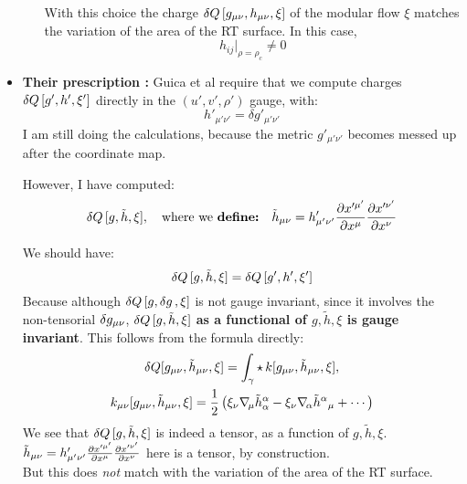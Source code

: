 \documentclass[12pt,a4paper,utf8]{article}
\begin{document}
\begin{itemize}
\begin{itemize}
		With this choice the charge $\mathinner{\delta Q}[g_{\mu\nu},h_{\mu\nu},\xi]$ of the modular flow $\xi$ matches the variation of the area of the RT surface. In this case,
		\begin{equation}
			h_{ij}|_{\rho = \rho_c} \ne 0
		\end{equation}
	
	\end{itemize}
	
\item \textbf{Their prescription \cite{Guica:2019nzm,Kraus:2021cwf}:} Guica et al require that we compute charges $\mathinner{\delta Q}[g',h',\xi']$ directly in the $(u',v',\rho')$ gauge, with:
	\begin{equation}
		h'_{\mu'\nu'}
		= \delta g'_{\mu'\nu'}
	\end{equation}
	I am still doing the calculations, because the metric $g'_{\mu'\nu'}$ becomes messed up after the coordinate map. 
	
\pagebreak
	
	However, I have computed:
	\begin{equation}
		\mathinner{\delta Q}[g,\tilde{h},\xi],
	\quad\text{where we \textbf{define:}}\quad
		\tilde{h}_{\mu\nu} = h'_{\mu'\nu'}
			\frac{\partial{x'^{\mu'}}}{\partial{x^\mu}}
			\frac{\partial{x'^{\nu'}}}{\partial{x^\nu}}
	\end{equation}
	
\pagebreak[3]
	
	We should have:
	\begin{equation}
		\mathinner{\delta Q}[g,\tilde{h},\xi]
		= \mathinner{\delta Q}[g',h',\xi']
	\end{equation}
	Because although $\mathinner{\delta Q}[g,\mathinner{\delta g},\xi]$ is not gauge invariant, since it involves the non-tensorial $\mathinner{\delta g_{\mu\nu}}$, $\mathinner{\delta Q}[g,\tilde{h},\xi]$ \textbf{as a functional of $g,\tilde{h},\xi$ is gauge invariant}. This follows from the formula directly:
	\begin{gather}
		\delta Q [g_{\mu\nu}, \tilde{h}_{\mu\nu}, \xi]
		= \int_\gamma
			\operatorname{\star} k [g_{\mu\nu}, \tilde{h}_{\mu\nu}, \xi],
	\\
		k_{\mu\nu} [g_{\mu\nu}, \tilde{h}_{\mu\nu}, \xi]
		= \frac{1}{2} \left(
				\xi_\nu \nabla_{\!\mathnormal{\mu}} \tilde{h}^\alpha_\alpha
				- \xi_\nu \nabla_{\!\mathnormal{\alpha}} \tilde{h}^\alpha{}_\mu
				+ \cdots
			\right)
	\end{gather}
	We see that $\mathinner{\delta Q}[g,\tilde{h},\xi]$ is indeed a tensor, as a function of $g,\tilde{h},\xi$. \\
	\mbox{$
		\tilde{h}_{\mu\nu} = h'_{\mu'\nu'}
			\frac{\partial{x'^{\mu'}}}{\partial{x^\mu}}
			\frac{\partial{x'^{\nu'}}}{\partial{x^\nu}}
	$} here is a tensor, by construction. \\
	But this does \textit{not} match with the variation of the area of the RT surface.
	

\end{itemize}
\end{document}
